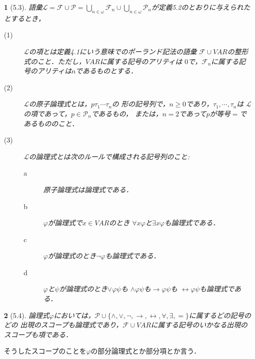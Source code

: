 \documentclass[a4j,10.5pt,oneside,openany]{jsbook}
\theoremstyle{mystyle}
\newtheorem{thm}{\color{DarkMidnightBlue}{定理}}[section]
\newtheorem{dfn}[thm]{\color{PakistanGreen}{定義}}
\begin{document}
	\begin{screen}
		\begin{dfn}[5.3]
			語彙$\mathcal{L} = \mathcal{F} \cup \mathcal{P}
			= \bigcup_{n \in \omega} \mathcal{F}_{n} \cup \bigcup_{n \in \omega} \mathcal{P}_{n}$が定義5.2のとおりに与えられたとするとき，
			\begin{description}
				\item[(1)] $\mathcal{L}$の項とは定義4.1にいう意味でのポーランド記法の語彙
					$\mathcal{F} \cup VAR$の整形式のこと．ただし，$VAR$に属する記号のアリティは
					$0$で，$\mathcal{F}_{n}$に属する記号のアリティは$n$であるものとする．
				
				\item[(2)] $\mathcal{L}$の原子論理式とは，$p\tau_{1}\cdots\tau_{n}$の
					形の記号列で，$n \geq 0$であり，$\tau_{1},\cdots,\tau_{n}$は
					$\mathcal{L}$の項であって，$p \in \mathcal{P}_{n}$であるもの，
					または，$n=2$であって$p$が等号$=$であるもののこと．
					
				\item[(3)] $\mathcal{L}$の論理式とは次のルールで構成される記号列のこと:
					\begin{description}
						\item[a] 原子論理式は論理式である．
						\item[b] $\varphi$が論理式で$x \in VAR$のとき
							$\forall x \varphi$と$\exists x \varphi$も論理式である．
						\item[c] $\varphi$が論理式のとき$\neg \varphi$も論理式である．
						\item[d] $\varphi$と$\psi$が論理式のとき$\vee \varphi \psi$も
							$\wedge \varphi \psi$も$\rightarrow \varphi \psi$も
							$\leftrightarrow \varphi \psi$も論理式である．
					\end{description}
			\end{description}
		\end{dfn}
	\end{screen}
	
	\begin{screen}
		\begin{thm}[5.4]
			論理式$\varphi$においては，$\mathcal{P} \cup \{\wedge,\vee,\neg,
			\rightarrow,\leftrightarrow,\forall,\exists,=\}$に属するどの記号のどの
			出現のスコープも論理式であり，$\mathcal{F} \cup VAR$に属する記号のいかなる出現の
			スコープも項である．
		\end{thm}
	\end{screen}
	
	そうしたスコープのことを$\varphi$の部分論理式とか部分項とか言う．
	
\end{document}
